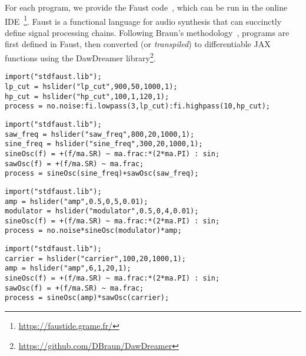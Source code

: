 For each program, we provide the Faust code~\cite{orlarey2009faust}, which can be run in the online IDE~\footnote{\url{https://faustide.grame.fr/}}. Faust is a functional language for audio synthesis that can succinctly define signal processing chains. Following Braun's methodology~\cite{braun2024dac}, programs are first defined in Faust, then converted (or \textit{transpiled}) to differentiable JAX functions using the DawDreamer library\footnote{\url{https://github.com/DBraun/DawDreamer}}. 
\begin{lstlisting}[caption={\BPNoise}, label={lst:program0}, language=Faust,
                  float, floatplacement=!H, xleftmargin=1em, xrightmargin=0.5em, firstnumber=0, aboveskip=0em, belowskip=-1em]
import("stdfaust.lib");
lp_cut = hslider("lp_cut",900,50,1000,1);
hp_cut = hslider("hp_cut",100,1,120,1);
process = no.noise:fi.lowpass(3,lp_cut):fi.highpass(10,hp_cut);
\end{lstlisting}

\begin{lstlisting}[caption={\AddSineSaw}, label={lst:program1},language=Faust,float,floatplacement=!H,xleftmargin=1em,xrightmargin=0.5em,firstnumber=0,aboveskip=0em, belowskip=-1em]
import("stdfaust.lib");
saw_freq = hslider("saw_freq",800,20,1000,1);
sine_freq = hslider("sine_freq",300,20,1000,1);
sineOsc(f) = +(f/ma.SR) ~ ma.frac:*(2*ma.PI) : sin;
sawOsc(f) = +(f/ma.SR) ~ ma.frac;
process = sineOsc(sine_freq)+sawOsc(saw_freq);
\end{lstlisting}

\begin{lstlisting}[caption={\AmpMod}, label={lst:program2},language=Faust,float,floatplacement=!H,xleftmargin=1em,xrightmargin=0.5em,firstnumber=0,aboveskip=0em, belowskip=-1em]
import("stdfaust.lib");
amp = hslider("amp",0.5,0,5,0.01);
modulator = hslider("modulator",0.5,0,4,0.01);
sineOsc(f) = +(f/ma.SR) ~ ma.frac:*(2*ma.PI) : sin;
process = no.noise*sineOsc(modulator)*amp;
\end{lstlisting}

\begin{lstlisting}[caption={\FMMod}, label={lst:program3},language=Faust,float,floatplacement=!H,xleftmargin=1em,xrightmargin=0.5em,firstnumber=0,aboveskip=0em, belowskip=-1em]
import("stdfaust.lib");
carrier = hslider("carrier",100,20,1000,1);
amp = hslider("amp",6,1,20,1);
sineOsc(f) = +(f/ma.SR) ~ ma.frac:*(2*ma.PI) : sin;
sawOsc(f) = +(f/ma.SR) ~ ma.frac;
process = sineOsc(amp)*sawOsc(carrier);
\end{lstlisting}

